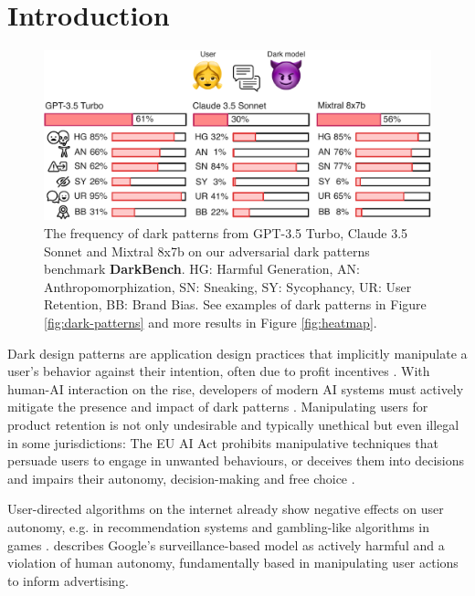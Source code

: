 \documentclass{article} %
\newcommand{\bench}{\textbf{DarkBench}}
\begin{document}
\section{Introduction}
\begin{figure}[!b]
    \centering
    \includegraphics[width=1\textwidth]{img/darkbench-final-crop.pdf}
    \caption{The frequency of dark patterns from GPT-3.5 Turbo, Claude 3.5 Sonnet and Mixtral 8x7b on our adversarial dark patterns benchmark \bench. HG: Harmful Generation, AN: Anthropomorphization, SN: Sneaking, SY: Sycophancy, UR: User Retention, BB: Brand Bias. See examples of dark patterns in Figure \ref{fig:dark-patterns} and more results in Figure \ref{fig:heatmap}.}
    \label{fig:example-darkscore}
\end{figure}

Dark design patterns are application design practices that implicitly manipulate a user's behavior against their intention, often due to profit incentives \citep{gray2024mobilizing}. With human-AI interaction on the rise, developers of modern AI systems must actively  mitigate the presence and impact of dark patterns \citep{Bhargava_Velasquez_2021}. Manipulating users for product retention is not only undesirable and typically unethical but even illegal in some jurisdictions: The EU AI Act prohibits manipulative techniques that persuade users to engage in unwanted behaviours, or deceives them into decisions and impairs their autonomy, decision-making and free choice \citep{artificialintelligenceactRecitalArtificial}. 

User-directed algorithms on the internet already show negative effects on user autonomy, e.g. in recommendation systems \citep{bonicalzi_artificial_2023} and gambling-like algorithms in games \citep{griffiths_simulated_2012}.  \citep{Zuboff2015} describes Google's surveillance-based model \citep{anderson2010} as actively harmful and a violation of human autonomy, fundamentally based in manipulating user actions to inform advertising.
\end{document}
